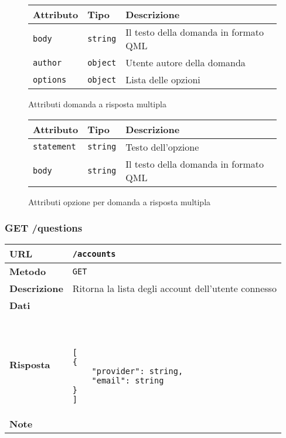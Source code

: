     \begin{figure}[H]
        \begin{tabular}{ | l | l | l | } 
        \hline
            Attributo & Tipo & Descrizione \\
        \hline
            \texttt{body} & \texttt{string} & 
                Il testo della domanda in formato QML \\
            \texttt{author} & \texttt{object} & 
                Utente autore della domanda \\
            \texttt{options} & \texttt{object} & 
                Lista delle opzioni \\
        \hline
        \end{tabular}
        \caption {Attributi domanda a risposta multipla}
    \end{figure}

    \begin{figure}[H]
        \begin{tabular}{ | l | l | l | } 
        \hline
            Attributo & Tipo & Descrizione \\
        \hline
            \texttt{statement} & \texttt{string} & 
                Testo dell'opzione \\
            \texttt{body} & \texttt{string} & 
                Il testo della domanda in formato QML \\
        \hline
        \end{tabular}
        \caption {Attributi opzione per domanda a risposta multipla}
    \end{figure}

    \subsubsection{GET /questions}

        \begin{tabular}{|l|l|} 
            \hline
            \textbf{URL} & \texttt{/accounts} \\ \hline
            \textbf{Metodo} & \texttt{GET} \\ \hline
            \textbf{Descrizione} & 
                Ritorna la lista degli account dell'utente connesso \\ \hline
            \textbf{Dati} & \\ \hline
            \textbf{Risposta} & \
                \begin{lstlisting}[basicstyle={\ttfamily}]
[
{
    "provider": string,
    "email": string
}
]
                \end{lstlisting} \\ \hline
            \textbf{Note} & \\ \hline
        \end{tabular}


